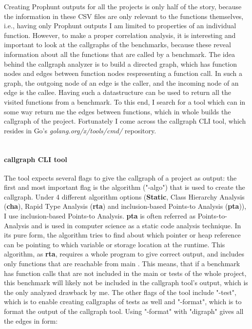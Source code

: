 \documentclass{seal_thesis}
\begin{document}
Creating Prophunt outputs for all the projects is only half of the story, because the information in these CSV files are only relevant to the functions themselves, i.e., having only Prophunt outputs I am limited to properties of an individual function. However, to make a proper correlation analysis, it is interesting and important to look at the callgraphs of the benchmarks, because these reveal information about all the functions that are called by a benchmark. The idea behind the callgraph analyzer is to build a directed graph, which has function nodes and edges between function nodes respresenting a function call. In such a graph, the outgoing node of an edge is the caller, and the incoming node of an edge is the callee. Having such a datastructure can be used to return all the visited functions from a benchmark. To this end, I search for a tool which can in some way return me the edges between functions, which in whole builds the callgraph of the project. Fortunately I come across the callgraph CLI tool, which resides in Go's \textit{golang.org/x/tools/cmd/} repository\cite{callgraphtool}.\\
\\
\paragraph{callgraph CLI tool} The tool expects several flags to give the callgraph of a project as output: the first and most important flag is the algorithm ("-algo") that is used to create the callgraph. Under 4 different algorithm options (\textbf{Static}, Class Hierarchy Analysis (\textbf{cha}), Rapid Type Analysis (\textbf{rta}) and inclusion-based Points-to Analysis (\textbf{pta})), I use inclusion-based Points-to Analysis. \textbf{pta} is often referred as Points-to-Analysis and is used in computer science as a static code analysis technique. In its pure form, the algorithm tries to find about which pointer or heap reference can be pointing to which variable or storage location at the runtime. This algorithm, as \textbf{rta}, requires a whole program to give correct output, and includes only functions that are reachable from main \cite{callgraphtool}. This means, that if a benchmark has function calls that are not included in the main or tests of the whole project, this benchmark will likely not be included in the callgraph tool's output, which is the only analyzed drawback by me. The other flags of the tool include "-test", which is to enable creating callgraphs of tests as well and "-format", which is to format the output of the callgraph tool. Using "-format" with "digraph" gives all the edges in form:
\end{document}
